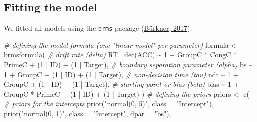 \documentclass[
  11pt,
  english,
  ,doc,floatsintext]{apa6}
\newenvironment{Shaded}{}{}
\newcommand{\AttributeTok}[1]{\textcolor[rgb]{0.49,0.56,0.16}{#1}}
\newcommand{\CommentTok}[1]{\textcolor[rgb]{0.38,0.63,0.69}{\textit{#1}}}
\newcommand{\DecValTok}[1]{\textcolor[rgb]{0.25,0.63,0.44}{#1}}
\newcommand{\FunctionTok}[1]{\textcolor[rgb]{0.02,0.16,0.49}{#1}}
\newcommand{\NormalTok}[1]{#1}
\newcommand{\OtherTok}[1]{\textcolor[rgb]{0.00,0.44,0.13}{#1}}
\newcommand{\SpecialCharTok}[1]{\textcolor[rgb]{0.25,0.44,0.63}{#1}}
\newcommand{\StringTok}[1]{\textcolor[rgb]{0.25,0.44,0.63}{#1}}
\begin{document}
\hypertarget{fitting-the-model}{%
\subsection{Fitting the model}\label{fitting-the-model}}

We fitted all models using the \texttt{brms} package (\protect\hyperlink{ref-R-brms_a}{Bürkner, 2017}).

\begin{Shaded}
\begin{Highlighting}[]
\CommentTok{\# defining the model formula (one "linear model" per parameter)}
\NormalTok{formula }\OtherTok{\textless{}{-}} \FunctionTok{brmsformula}\NormalTok{(}
  \CommentTok{\# drift rate (delta)}
\NormalTok{  RT }\SpecialCharTok{|} \FunctionTok{dec}\NormalTok{(ACC) }\SpecialCharTok{\textasciitilde{}} \DecValTok{1} \SpecialCharTok{+}\NormalTok{ GroupC }\SpecialCharTok{*}\NormalTok{ CongC }\SpecialCharTok{*}\NormalTok{ PrimeC }\SpecialCharTok{+}\NormalTok{ (}\DecValTok{1} \SpecialCharTok{|}\NormalTok{ ID) }\SpecialCharTok{+}\NormalTok{ (}\DecValTok{1} \SpecialCharTok{|}\NormalTok{ Target),}
  \CommentTok{\# boundary separation parameter (alpha)}
\NormalTok{  bs }\SpecialCharTok{\textasciitilde{}} \DecValTok{1} \SpecialCharTok{+}\NormalTok{ GroupC }\SpecialCharTok{+}\NormalTok{ (}\DecValTok{1} \SpecialCharTok{|}\NormalTok{ ID) }\SpecialCharTok{+}\NormalTok{ (}\DecValTok{1} \SpecialCharTok{|}\NormalTok{ Target),}
  \CommentTok{\# non{-}decision time (tau)}
\NormalTok{  ndt }\SpecialCharTok{\textasciitilde{}} \DecValTok{1} \SpecialCharTok{+}\NormalTok{ GroupC }\SpecialCharTok{+}\NormalTok{ (}\DecValTok{1} \SpecialCharTok{|}\NormalTok{ ID) }\SpecialCharTok{+}\NormalTok{ (}\DecValTok{1} \SpecialCharTok{|}\NormalTok{ Target),}
  \CommentTok{\# starting point or bias (beta)}
\NormalTok{  bias }\SpecialCharTok{\textasciitilde{}} \DecValTok{1} \SpecialCharTok{+}\NormalTok{ GroupC }\SpecialCharTok{*}\NormalTok{ PrimeC }\SpecialCharTok{+}\NormalTok{ (}\DecValTok{1} \SpecialCharTok{|}\NormalTok{ ID) }\SpecialCharTok{+}\NormalTok{ (}\DecValTok{1} \SpecialCharTok{|}\NormalTok{ Target)}
\NormalTok{  )}
\CommentTok{\# defining the priors}
\NormalTok{priors }\OtherTok{\textless{}{-}} \FunctionTok{c}\NormalTok{(}
  \CommentTok{\# priors for the intercepts}
  \FunctionTok{prior}\NormalTok{(}\StringTok{"normal(0, 5)"}\NormalTok{, }\AttributeTok{class =} \StringTok{"Intercept"}\NormalTok{),}
  \FunctionTok{prior}\NormalTok{(}\StringTok{"normal(0, 1)"}\NormalTok{, }\AttributeTok{class =} \StringTok{"Intercept"}\NormalTok{, }\AttributeTok{dpar =} \StringTok{"bs"}\NormalTok{),}

\end{Highlighting}
\end{Shaded}
\end{document}
